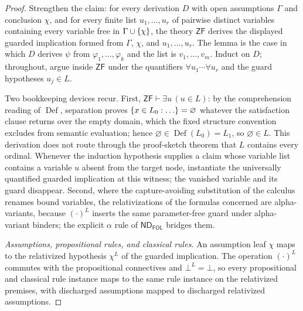 \documentclass[11pt,oneside,openany]{book}
\theoremstyle{definition}
\theoremstyle{plain}
\theoremstyle{remark}
\DeclarePairedDelimiter{\set}{\lbrace}{\rbrace}
\newcommand{\derives}{\vdash}
\newcommand{\bottom}{\bot}
\newcommand{\ND}{\mathsf{ND}}
\newcommand{\ZF}{\mathsf{ZF}}
\newcommand{\FOL}{\mathsf{FOL}}
\begin{document}
\begin{proof}
Strengthen the claim: for every derivation \(D\) with open assumptions
\(\Gamma\) and conclusion \(\chi\), and for every finite list
\(u_1,\ldots,u_r\) of pairwise distinct variables containing every variable
free in \(\Gamma\cup\set{\chi}\), the theory \(\ZF\) derives the displayed
guarded implication formed from \(\Gamma\), \(\chi\), and
\(u_1,\ldots,u_r\).  The lemma is the case in which \(D\) derives \(\psi\)
from \(\varphi_1,\ldots,\varphi_k\) and the list is \(v_1,\ldots,v_m\).
Induct on \(D\); throughout, argue inside \(\ZF\) under the quantifiers
\(\forall u_1\cdots\forall u_r\) and the guard hypotheses \(u_j\in L\).

Two bookkeeping devices recur.  First, \(\ZF\derives\exists u\,(u\in L)\):
by the comprehension reading of \(\operatorname{Def}\), separation proves
\(\set{x\in L_0:\ldots}=\varnothing\) whatever the satisfaction clause
returns over the empty domain, which the fixed structure convention
excludes from semantic evaluation; hence
\(\varnothing\in\operatorname{Def}(L_0)=L_1\), so \(\varnothing\in L\).
This derivation does not route through the proof-sketch theorem that \(L\)
contains every ordinal.  Whenever the induction hypothesis supplies a claim
whose variable list contains a variable \(u\) absent from the target node,
instantiate the universally quantified guarded implication at this witness;
the vanished variable and its guard disappear.  Second, where the
capture-avoiding substitution of the calculus renames bound variables, the
relativizations of the formulas concerned are alpha-variants, because
\((\cdot)^{L}\) inserts the same parameter-free guard under alpha-variant
binders; the explicit \(\alpha\) rule of \(\ND_{\FOL}\) bridges them.

\emph{Assumptions, propositional rules, and classical rules.}  An
assumption leaf \(\chi\) maps to the relativized hypothesis \(\chi^{L}\) of
the guarded implication.  The operation \((\cdot)^{L}\) commutes with the
propositional connectives and \(\bottom^{L}=\bottom\), so every
propositional and classical rule instance maps to the same rule instance on
the relativized premises, with discharged assumptions mapped to discharged
relativized assumptions.


\end{proof}
\end{document}
